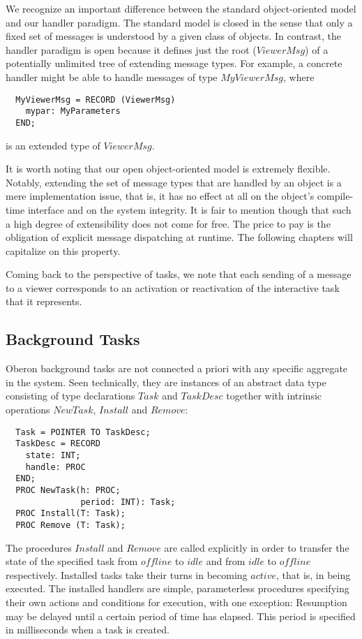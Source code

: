 We recognize an important difference between the standard object-oriented model and our
handler paradigm. The standard model is closed in the sense that only a fixed set of messages is
understood by a given class of objects. In contrast, the handler paradigm is open because it
defines just the root ($ViewerMsg$) of a potentially unlimited tree of extending message types. For example, a concrete handler might be able to handle messages of type $MyViewerMsg$, where
\begin{verbatim}
  MyViewerMsg = RECORD (ViewerMsg)
    mypar: MyParameters
  END;
\end{verbatim}
is an extended type of $ViewerMsg$.

It is worth noting that our open object-oriented model is extremely flexible. Notably, extending the
set of message types that are handled by an object is a mere implementation issue, that is, it has
no effect at all on the object’s compile-time interface and on the system integrity. It is fair to
mention though that such a high degree of extensibility does not come for free. The price to pay is
the obligation of explicit message dispatching at runtime. The following chapters will capitalize on this property.

Coming back to the perspective of tasks, we note that each sending of a message to a viewer
corresponds to an activation or reactivation of the interactive task that it represents.

\subsection{Background Tasks}
Oberon background tasks are not connected a priori with any specific aggregate in the system.
Seen technically, they are instances of an abstract data type consisting of type declarations $Task$ and $TaskDesc$ together with intrinsic operations $NewTask$, $Install$ and $Remove$:
\begin{verbatim}
  Task = POINTER TO TaskDesc;
  TaskDesc = RECORD
    state: INT;
    handle: PROC
  END;
  PROC NewTask(h: PROC;
               period: INT): Task;
  PROC Install(T: Task);
  PROC Remove (T: Task);
\end{verbatim}
The procedures $Install$ and $Remove$ are called explicitly in order to transfer the state of the specified task from $offline$ to $idle$ and from $idle$ to $offline$ respectively. Installed tasks take their
turns in becoming $active$, that is, in being executed. The installed handlers are simple, parameterless procedures specifying their own actions and conditions for execution, with one exception: Resumption may be delayed until a certain period of time has elapsed. This period is specified in milliseconds when a task is created.

